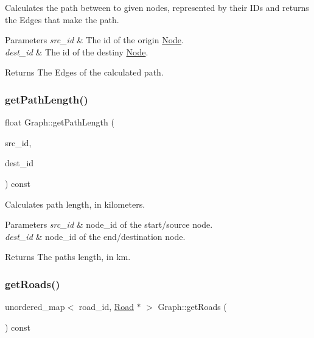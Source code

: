 Calculates the path between to given nodes, represented by their I\+Ds and returns the Edges that make the path.


\begin{DoxyParams}{Parameters}
{\em src\+\_\+id} & The id of the origin \hyperlink{class_node}{Node}. \\
\hline
{\em dest\+\_\+id} & The id of the destiny \hyperlink{class_node}{Node}.\\
\hline
\end{DoxyParams}
\begin{DoxyReturn}{Returns}
The Edges of the calculated path. 
\end{DoxyReturn}
\hypertarget{class_graph_adb19e47c0238b012a6a3a28bdaf855f8}{}\label{class_graph_adb19e47c0238b012a6a3a28bdaf855f8} 
\subsubsection{\texorpdfstring{get\+Path\+Length()}{getPathLength()}}
{\footnotesize\ttfamily float Graph\+::get\+Path\+Length (\begin{DoxyParamCaption}\item[{node\+\_\+id}]{src\+\_\+id,  }\item[{node\+\_\+id}]{dest\+\_\+id }\end{DoxyParamCaption}) const}

Calculates path length, in kilometers.


\begin{DoxyParams}{Parameters}
{\em src\+\_\+id} & node\+\_\+id of the start/source node. \\
\hline
{\em dest\+\_\+id} & node\+\_\+id of the end/destination node.\\
\hline
\end{DoxyParams}
\begin{DoxyReturn}{Returns}
The path\textquotesingle{}s length, in km. 
\end{DoxyReturn}
\hypertarget{class_graph_a101befc9baedb7dc3aaa714c968dc943}{}\label{class_graph_a101befc9baedb7dc3aaa714c968dc943} 
\subsubsection{\texorpdfstring{get\+Roads()}{getRoads()}}
{\footnotesize\ttfamily unordered\+\_\+map$<$ road\+\_\+id, \hyperlink{class_road}{Road} $\ast$ $>$ Graph\+::get\+Roads (\begin{DoxyParamCaption}{ }\end{DoxyParamCaption}) const}

